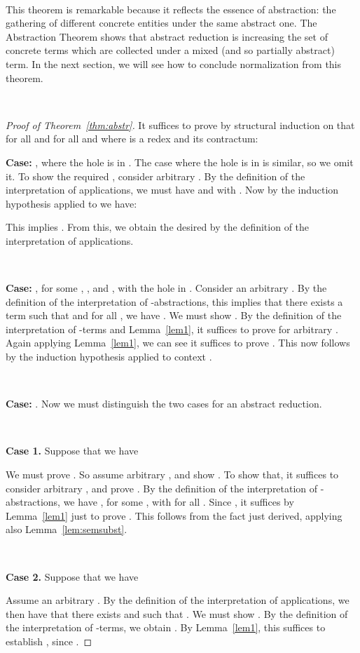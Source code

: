 \documentclass{LMCS}
\begin{document}
\

\noindent This theorem is remarkable because it reflects the essence of
abstraction: the gathering of different concrete entities under the
same abstract one.  The Abstraction Theorem shows that abstract
reduction is increasing the set of concrete terms which are collected
under a mixed (and so partially abstract) term.  In the next section,
we will see how to conclude normalization from this theorem.

\

\begin{proof}[Proof of Theorem~\ref{thm:abstr}]
It suffices to prove by structural induction on  that for all
 and for all  and  where  is a redex and  its
contractum:

\noindent \textbf{Case:} , where the hole is
in .  The case where the hole is in  is similar, so we omit
it.  To show the required
,
consider arbitrary .  By the definition
of the interpretation of applications, we must have
 and  with
.  Now by the induction hypothesis applied to
 we have:

\noindent This implies .  From
this, we obtain the desired  by the
definition of the interpretation of applications.

\

\noindent \textbf{Case:} , for some
, , and , with the hole in .  Consider an arbitrary
.  By the definition of the
interpretation of -abstractions, this implies that there
exists a term  such that  and for all
, we have
.  We must
show .  By the definition of
the interpretation of -terms and Lemma~\ref{lem1}, it suffices to
prove  for
arbitrary .  Again applying Lemma~\ref{lem1},
we can see it suffices to prove
.  This now
follows by the induction hypothesis applied to context .

\

\noindent \textbf{Case:} .  Now we must distinguish the
two cases for an abstract reduction.

\

\noindent \textbf{Case 1.} Suppose that we have

\noindent We must prove .  So assume
arbitrary , and show
.  To show that, it suffices to consider
arbitrary , and prove
.  By the definition of the
interpretation of -abstractions, we have , for some , with
 for all
.  Since , it suffices
by Lemma~\ref{lem1} just to prove .
This follows from the fact just derived, applying also Lemma~\ref{lem:semsubst}.


\

\noindent \textbf{Case 2.} Suppose that we have

\noindent Assume an arbitrary .  By the
definition of the interpretation of applications, we then have that
there exists  and 
such that .  We must show .
By the definition of the interpretation of -terms, we obtain
.  By Lemma~\ref{lem1}, this suffices
to  establish , since .
\end{proof}
\end{document}
